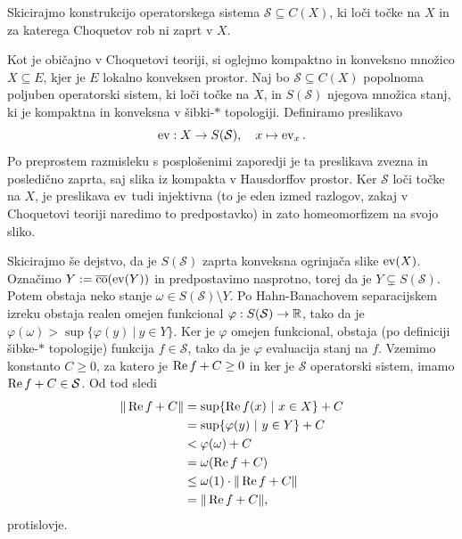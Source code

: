 \begin{zgled}
    Skicirajmo konstrukcijo operatorskega sistema $\mathcal{S} \subseteq C(X)$,
    ki loči točke na $X$ in za katerega Choquetov rob ni zaprt v $X$.

    Kot je običajno v Choquetovi teoriji, si oglejmo kompaktno in konveksno množico $X \subseteq E$,
    kjer je $E$ lokalno konveksen prostor. Naj bo $\mathcal{S} \subseteq C(X)$ popolnoma poljuben operatorski sistem, ki loči točke na $X$,
    in $S(\mathcal{S})$ njegova množica stanj, ki je kompaktna in konveksna v šibki-$*$ topologiji.
    Definiramo preslikavo 
    $$\operatorname{ev}: X \to S(\mathcal{S}),\quad x \mapsto \operatorname{ev}_x.$$
    Po preprostem razmisleku s posplošenimi zaporedji je ta preslikava zvezna in posledično zaprta,
    saj slika iz kompakta v Hausdorffov prostor.
    Ker $\mathcal{S}$ loči točke na $X$, je preslikava $\operatorname{ev}$ tudi injektivna (to je eden izmed razlogov, zakaj v Choquetovi teoriji naredimo to predpostavko)
    in zato homeomorfizem na svojo sliko.
    
    Skicirajmo še dejstvo, da je $S(\mathcal{S})$ zaprta konveksna ogrinjača slike $\operatorname{ev} (X)$.
    Označimo $Y := \overline{\operatorname{co}} (\operatorname{ev}(Y))$ in predpostavimo nasprotno, torej da je $Y \subsetneq S(\mathcal{S})$.
    Potem obstaja neko stanje $\omega \in S(\mathcal{S}) \setminus Y$.
    Po Hahn-Banachovem separacijskem izreku obstaja realen omejen funkcional $\varphi: S(\mathcal{S}) \to \mathbb R$,
    tako da je $\varphi(\omega) > \sup \{\varphi(y)\ |\ y \in Y\}$. Ker je $\varphi$ omejen funkcional, obstaja (po definiciji šibke-$*$ topologije)
    funkcija $f \in \mathcal{S}$, tako da je $\varphi$ evaluacija stanj na $f$.
    Vzemimo konstanto $C \geq 0$, za katero je $\operatorname{Re} f + C \geq 0$ in ker je $\mathcal{S}$ operatorski sistem, imamo $\operatorname{Re} f + C \in \mathcal{S}$.
    Od tod sledi
    \begin{align*}
        \| \operatorname{Re} f + C\| &= \sup\{\operatorname{Re} f (x)\ |\ x \in X\} + C\\
        &=  \sup \{ \varphi(y)\ |\ y \in Y\} + C\\
        &< \varphi(\omega) + C\\
        &= \omega (\operatorname{Re} f + C)\\
        &\leq \omega(1) \cdot \| \operatorname{Re} f + C\|\\
        &= \| \operatorname{Re} f + C\|,
    \end{align*}
    protislovje. 


\end{zgled}
